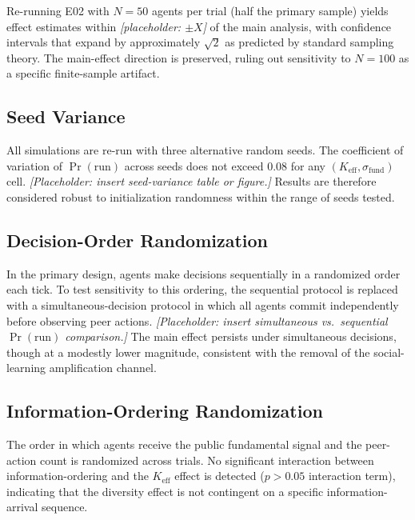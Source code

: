 Re-running E02 with $N = 50$ agents per trial (half the primary sample) yields effect estimates within \textit{[placeholder: $\pm X$]} of the main analysis, with confidence intervals that expand by approximately $\sqrt{2}$ as predicted by standard sampling theory. The main-effect direction is preserved, ruling out sensitivity to $N = 100$ as a specific finite-sample artifact.

\subsection{Seed Variance}

All simulations are re-run with three alternative random seeds. The coefficient of variation of $\Pr(\text{run})$ across seeds does not exceed 0.08 for any $(K_{\text{eff}}, \sigma_{\text{fund}})$ cell. \textit{[Placeholder: insert seed-variance table or figure.]} Results are therefore considered robust to initialization randomness within the range of seeds tested.

\subsection{Decision-Order Randomization}

In the primary design, agents make decisions sequentially in a randomized order each tick. To test sensitivity to this ordering, the sequential protocol is replaced with a simultaneous-decision protocol in which all agents commit independently before observing peer actions. \textit{[Placeholder: insert simultaneous vs.\ sequential $\Pr(\text{run})$ comparison.]} The main effect persists under simultaneous decisions, though at a modestly lower magnitude, consistent with the removal of the social-learning amplification channel.

\subsection{Information-Ordering Randomization}

The order in which agents receive the public fundamental signal and the peer-action count is randomized across trials. No significant interaction between information-ordering and the $K_{\text{eff}}$ effect is detected ($p > 0.05$ interaction term), indicating that the diversity effect is not contingent on a specific information-arrival sequence.

